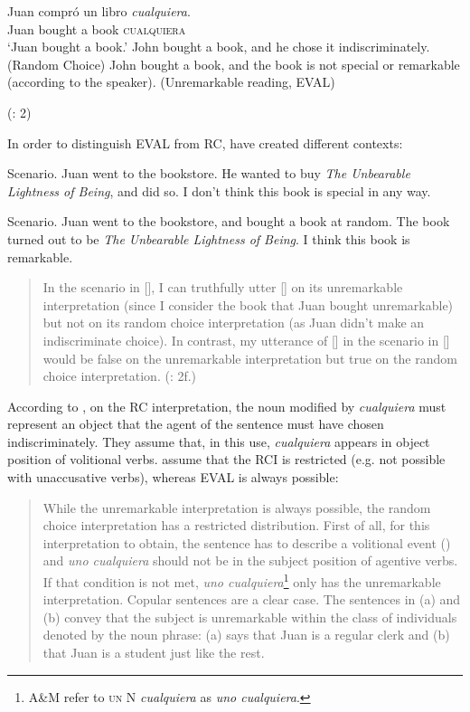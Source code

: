\ea %
\label{bkm:Ref533953640} 
\gll Juan compró un libro \textit{cualquiera}.\\
Juan bought a book \textsc{cualquiera}\\
\glt ‘Juan bought a book.’
\ea  John bought a book, and he chose it indiscriminately. (Random Choice)
\ex John bought a book, and the book is not special or remarkable (according to the speaker). (Unremarkable reading, EVAL)

    (\citealt{am2018}: 2)
\z
\z

In order to distinguish EVAL from RC, \citet{Alonso-OvalleMenéndez-Benito2011,am2018} have created different contexts:


\ea %
\label{bkm:Ref54686706}  Scenario. Juan went to the bookstore. He wanted to buy \textit{The Unbearable Lightness of Being}, and did so. I don’t think this book is special in any way.
\z 

\ea %
\label{bkm:Ref533953745}  Scenario. Juan went to the bookstore, and bought a book at random. The book turned out to be \textit{The Unbearable Lightness of Being}. I think this book is remarkable.
\z

\begin{quote}
In the scenario in [], I can truthfully utter [] on its unremarkable interpretation (since I consider the book that Juan bought unremarkable) but not on its random choice interpretation (as Juan didn’t make an indiscriminate choice). In contrast, my utterance of [] in the scenario in [] would be false on the unremarkable interpretation but true on the random choice interpretation.
(\citealt{am2018}: 2f.)
\end{quote}

According to \citet{am2018}, on the RC interpretation, the noun modified by \textit{cualquiera} must represent an object that the agent of the sentence must have chosen indiscriminately. They assume that, in this use, \textit{cualquiera} appears in object position of volitional verbs. \citet{Alonso-OvalleMenéndez-Benito2011} assume that the RCI is restricted (e.g. not possible with unaccusative verbs), whereas EVAL is always possible:

\begin{quote}%
While the unremarkable interpretation is always possible, the random choice interpretation has a restricted distribution. First of all, for this interpretation to obtain, the sentence has to describe a volitional event (\citealt{ChoiRomero2008}) and \textit{uno cualquiera} should not be in the subject position of agentive verbs. If that condition is not met, \textit{uno cualquiera}\footnote{{A\&M refer to}
  \textsc{un}{} {N}{ \textit{cualquiera}} {as} {\textit{uno cualquiera}}.
 }
only has the unremarkable interpretation. Copular sentences are a clear case. The sentences in (a) and (b) convey that the subject is unremarkable within the class of individuals denoted by the noun phrase: (a) says that Juan is a regular clerk and (b) that Juan is a student just like the rest.
\end{quote}

